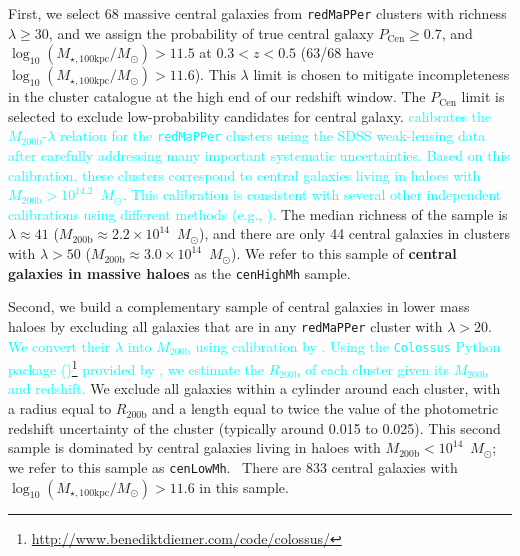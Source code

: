 \documentclass[a4paper,fleqn,usenatbib]{mnras}
\def\msun{$M_\odot$}
\def\redm{\texttt{redMaPPer}}
\def\rbcg{\texttt{cenHighMh}}
\def\nbcg{\texttt{cenLowMh}}
\def\mstar{{$M_{\star}$}}
\def\mhalo{{$M_{\mathrm{200b}}$}}
\def\logmtot{{$\log_{10} (M_{\star,100\mathrm{kpc}}/M_{\odot})$}}
\newcommand{\song}[1]{\textcolor{cyan}{#1}}
\begin{document}
 
    First, we select 68 massive central galaxies from \redm{} clusters 
    with richness $\lambda \geq 30$, and we assign the probability of true central 
    galaxy $P_{\mathrm{Cen}} \geq 0.7$, and \logmtot{}$ >11.5$ 
    at $0.3 < z < 0.5$ (63/68 have \logmtot{}$ >11.6$). 
    This $\lambda$ limit is chosen to mitigate incompleteness in the cluster catalogue
    at the high end of our redshift window. 
    The $P_{\mathrm{Cen}}$ limit is selected to exclude low-probability candidates for 
    central galaxy. 
    \song{
    \citet{Simet2017} calibrates the \mhalo{}-$\lambda$ relation for the \redm{} 
    clusters using the SDSS weak-lensing data after carefully addressing many 
    important systematic uncertainties.
    Based on this calibration, these clusters correspond to central galaxies living 
    in haloes with \mhalo{}$>10^{14.2}$~\msun{}. 
    This calibration is consistent with several other independent calibrations 
    using different methods (e.g., \citealt{Saro2015, Farahi2016, 
    Melchior2016, Murata2017}). 
    }
    The median richness of the sample is $\lambda \approx 41$ 
    (\mhalo{}$\approx 2.2 \times 10^{14}$~\msun{}), and there are 
    only 44 central galaxies in clusters with $\lambda>50$ 
    (\mhalo{}$\approx 3.0 \times 10^{14}$~\msun{}).
    We refer to this sample of \textbf{central galaxies in massive haloes} as 
    the \rbcg{} sample.
    
    Second, we build a complementary sample of central galaxies in lower mass haloes
    by excluding all galaxies that are in any \redm{} cluster with $\lambda > 20$.
    \song{
    We convert their $\lambda$ into $M_{\mathrm{200b}}$ using calibration by 
    \citet{Simet2017}. Using the \texttt{Colossus} Python package 
    (\citealt{Colossus})\footnote{\url{http://www.benediktdiemer.com/code/colossus/}}
    provided by \citet{Diemer2015}, we estimate the $R_{\mathrm{200b}}$ of each 
    cluster given its $M_{\mathrm{200b}}$ and redshift.
    } 
    We exclude all galaxies within a cylinder around each cluster, with a radius
    equal to $R_{\mathrm{200b}}$ and a length equal to twice the value of the 
    photometric redshift uncertainty of the cluster (typically around 0.015 to 0.025).
    This second sample is dominated by central galaxies living in haloes with
    $M_{\mathrm{200b}} < 10^{14}$~\msun{}; we refer to this sample as \nbcg{}. \
    There are 833 central galaxies with \logmtot{}$> 11.6$ in this sample.
\end{document}
